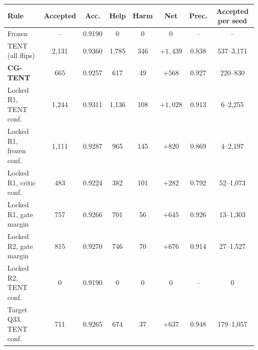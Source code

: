 \begin{tabular}{@{}lccccccc@{}}
\toprule
Rule & Accepted & Acc. & Help & Harm & Net & Prec. & Accepted per seed \\
\midrule
Frozen & -- & 0.9190 & 0 & 0 & 0 & -- & -- \\
TENT (all flips) & 2,131 & 0.9360 & 1,785 & 346 & $+1{,}439$ & 0.838 & 537--3,171 \\
\textbf{CG-TENT} & 665 & 0.9257 & 617 & 49 & $+568$ & 0.927 & 220--830 \\
\midrule
Locked R1, TENT conf. & 1,244 & 0.9311 & 1,136 & 108 & $+1{,}028$ & 0.913 & 6--2,255 \\
Locked R1, frozen conf. & 1,111 & 0.9287 & 965 & 145 & $+820$ & 0.869 & 4--2,197 \\
Locked R1, critic conf. & 483 & 0.9224 & 382 & 101 & $+282$ & 0.792 & 52--1,073 \\
Locked R1, gate margin & 757 & 0.9266 & 701 & 56 & $+645$ & 0.926 & 13--1,303 \\
Locked R2, gate margin & 815 & 0.9270 & 746 & 70 & $+676$ & 0.914 & 27--1,527 \\
Locked R2, TENT conf. & 0 & 0.9190 & 0 & 0 & 0 & -- & 0 \\
\midrule
Target Q33, TENT conf. & 711 & 0.9265 & 674 & 37 & $+637$ & 0.948 & 179--1,057 \\
\bottomrule
\end{tabular}
